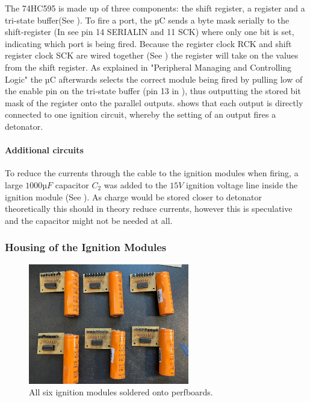 \noindent The 74HC595 is made up of three components: the shift register, a register and a tri-state buffer(See ). To fire a port, the µC sends a byte mask serially to the shift-register (In  see pin 14 SERIALIN and 11 SCK) where only one bit is set, indicating which port is being fired. Because the register clock RCK and shift register clock SCK are wired together (See ) the register will take on the values from the shift register. As explained in  "Peripheral Managing and Controlling Logic" the µC afterwards selects the correct module being fired by pulling low of the enable pin on the tri-state buffer (pin 13 in ), thus outputting the stored bit mask of the register onto the parallel outputs.  shows that each output is directly connected to one ignition circuit, whereby the setting of an output fires a detonator.\\

\paragraph{Additional circuits}
To reduce the currents through the cable to the ignition modules when firing, a large $1000µF$ capacitor $C_2$ was added to the $15V$ ignition voltage line inside the ignition module (See ). As charge would be stored closer to detonator theoretically this should in theory reduce currents, however this is speculative and the capacitor might not be needed at all.\\


\pagebreak

\subsubsection{Housing of the Ignition Modules}

\begin{figure}[!ht]
    \centering
    \includegraphics[width=7cm]{./Figures/raw_modules.jpeg}
    \caption{All six ignition modules soldered onto perfboards.}
    \label{fig:raw_modules}     
\end{figure}

